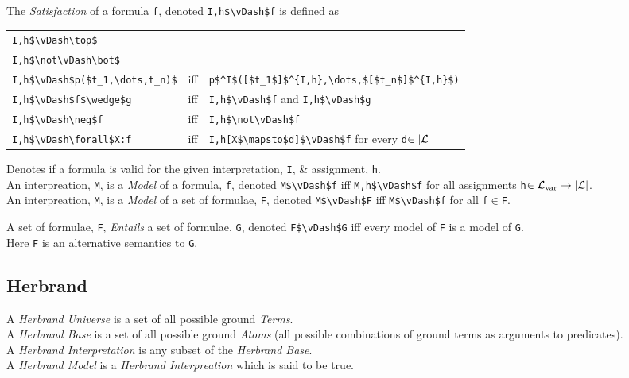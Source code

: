 \documentclass[11pt,a4paper]{article}
\begin{document}
The \textit{Satisfaction} of a formula \lstinline!f!, denoted \lstinline!I,h$\vDash$f! is defined as
\begin{center}\begin{tabular}{lll}
\lstinline!I,h$\vDash\top$!\\
\lstinline!I,h$\not\vDash\bot$!\\
\lstinline!I,h$\vDash$p($t_1,\dots,t_n)$!&iff&\lstinline!p$^I$([$t_1$]$^{I,h},\dots,$[$t_n$]$^{I,h}$)!\\
\lstinline!I,h$\vDash$f$\wedge$g!&iff&\lstinline!I,h$\vDash$f! and \lstinline!I,h$\vDash$g!\\
\lstinline!I,h$\vDash\neg$f!&iff&\lstinline!I,h$\not\vDash$f!\\
\lstinline!I,h$\vDash\forall$X:f!&iff&\lstinline!I,h[X$\mapsto$d]$\vDash$f! for every \lstinline!d!$\in|\mathcal{L}$
\end{tabular}\end{center}
\nb Denotes if a formula is valid for the given interpretation, \lstinline!I!, \& assignment, \lstinline!h!.\\

An interpreation, \lstinline!M!, is a \textit{Model} of a formula, \lstinline!f!, denoted \lstinline!M$\vDash$f! iff \lstinline!M,h$\vDash$f! for all assignments \lstinline!h!$\in\mathcal{L}_\text{var}\to|\mathcal{L}|$.\\


An interpreation, \lstinline!M!, is a \textit{Model} of a set of formulae, \lstinline!F!, denoted \lstinline!M$\vDash$F! iff \lstinline!M$\vDash$f! for all \lstinline!f!$\in$\lstinline!F!.\\


A set of formulae, \lstinline!F!, \textit{Entails} a set of formulae, \lstinline!G!, denoted \lstinline!F$\vDash$G! iff every model of \lstinline!F! is a model of \lstinline!G!.\\
\nb Here \lstinline!F! is an alternative semantics to \lstinline!G!.

\subsection{Herbrand}

A \textit{Herbrand Universe} is a set of all possible ground \textit{Terms}.\\
A \textit{Herbrand Base} is a set of all possible ground \textit{Atoms} (all possible combinations of ground terms as arguments to predicates).\\
A \textit{Herbrand Interpretation} is any subset of the \textit{Herbrand Base}.\\
A \textit{Herbrand Model} is a \textit{Herbrand Interpreation} which is said to be true.\\
\end{document}
